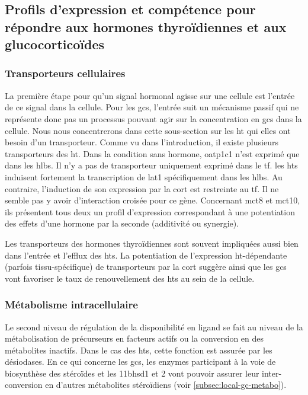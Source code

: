 \documentclass[../main.tex]{subfiles}
\begin{document}
	\subsection{Profils d'expression et compétence pour répondre aux hormones thyroïdiennes et aux glucocorticoïdes}

		\subsubsection{Transporteurs cellulaires}
			La première étape pour qu'un signal hormonal agisse sur une cellule est l'entrée de ce signal dans la cellule.
			Pour les \glspl{gc}, l'entrée suit un mécanisme passif qui ne représente donc pas un processus pouvant agir sur la concentration en \glspl{gc} dans la cellule.
			Nous nous concentrerons dans cette sous-section sur les \gls{ht} qui elles ont besoin d'un transporteur.
			Comme vu dans l'introduction, il existe plusieurs transporteurs des \gls{ht}.
			Dans la condition sans hormone, \gls{oatp}1c1 n'est exprimé que dans les \glspl{hlb}.
			Il n'y a pas de transporteur uniquement exprimé dans le \gls{tf}.
			les \glspl{ht} induisent fortement la transcription de \gls{lat}1 spécifiquement dans les \glspl{hlb}.
			Au contraire, l'induction de son expression par la \gls{cort} est restreinte au \gls{tf}.
			Il ne semble pas y avoir d'interaction croisée pour ce gène.
			Concernant \gls{mct}8 et \gls{mct}10, ils présentent tous deux un profil d'expression correspondant à une potentiation des effets d'une hormone par la seconde (additivité ou synergie).
			\par
			Les transporteurs des hormones thyroïdiennes sont souvent impliquées aussi bien dans l'entrée et l'efflux des \glspl{ht}.
			La potentiation de l'expression \gls{ht}-dépendante (parfois tissu-spécifique) de transporteurs par la \gls{cort} suggère ainsi que les \glspl{gc} vont favoriser le taux de renouvellement des \glspl{ht} au sein de la cellule.

		\subsubsection{Métabolisme intracellulaire}
			Le second niveau de régulation de la disponibilité en ligand se fait au niveau de la métabolisation de précurseurs en facteurs actifs ou la conversion en des métabolites inactifs.
			Dans le cas des \glspl{ht}, cette fonction est assurée par les désiodases.
			En ce qui concerne les \glspl{gc}, les enzymes participant à la voie de biosynthèse des stéroïdes et les \gls{11bhsd1} et 2 vont pouvoir assurer leur inter-conversion en d'autres métabolites stéroïdiens (voir \autoref{subsec:local-gc-metabo}).
\end{document}
